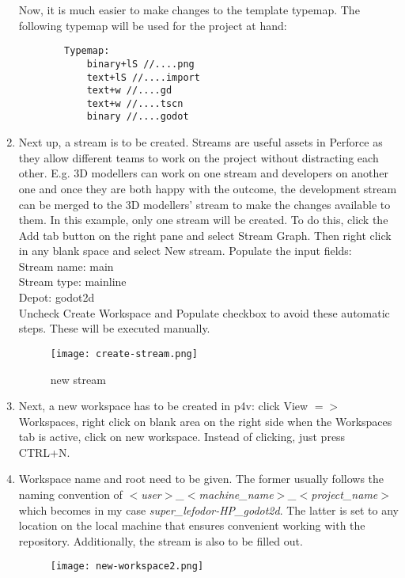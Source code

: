 \begin{enumerate}
\begin{verbatim}
    \end{verbatim}
    Now, it is much easier to make changes to the template typemap.
    The following typemap will be used for the project at hand:
    \begin{verbatim}
        Typemap:
            binary+lS //....png
            text+lS //....import
            text+w //....gd
            text+w //....tscn
            binary //....godot
    \end{verbatim}
    \item Next up, a stream is to be created. Streams are useful assets in Perforce as they allow different
    teams to work on the project without distracting each other. E.g. 3D modellers can work on one stream and developers 
    on another one and once they are both happy with the outcome, the development stream can be merged to the 3D modellers'
    stream to make the changes available to them. In this example, only one stream will be created.
    To do this, click the Add tab button on the right pane and select Stream Graph. Then right click in any blank space
    and select New stream. Populate the input fields: \\
    Stream name: main \\
    Stream type: mainline \\
    Depot: godot2d \\
    Uncheck Create Workspace and Populate checkbox to avoid these automatic steps. These will be executed manually.
    \begin{figure}[H]
        \centering
        \texttt{[image: create-stream.png]}
          \caption{new stream}
          \label{fig:new-stream}
    \end{figure}
    \item Next, a new workspace has to be created in p4v: click View {$=>$} Workspaces, right click on blank area on the
    right side when the Workspaces tab is active, click on new workspace. Instead of clicking, just press CTRL+N.
    \item Workspace name and root need to be given. The former usually follows the naming convention of 
    \textit{$<$user$>$\_$<$machine\_name$>$\_$<$project\_name$>$} which becomes in my case 
    \textit{super\_lefodor-HP\_godot2d}. The latter is set to any location on the local machine that ensures convenient
    working with the repository. Additionally, the stream is also to be filled out.
    \begin{figure}[H]
        \centering
        \texttt{[image: new-workspace2.png]}

\end{figure}
\end{enumerate}
